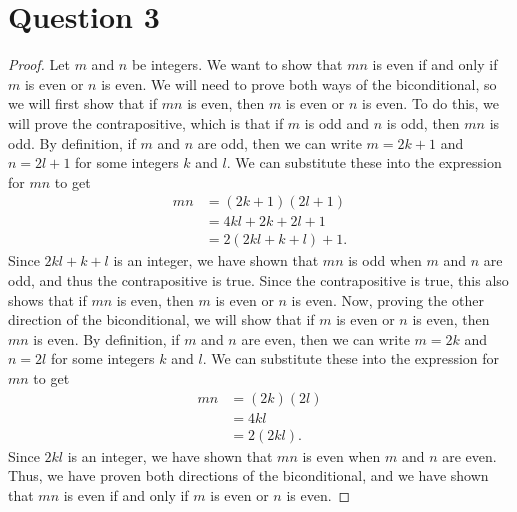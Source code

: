 \documentclass{article}
\begin{document}
\section*{Question 3}
\begin{proof}
    Let $m$ and $n$ be integers.
    We want to show that $mn$ is even if and only if $m$ is even or $n$ is even.
    We will need to prove both ways of the biconditional, so we will first show that 
    if $mn$ is even, then $m$ is even or $n$ is even.
    To do this, we will prove the contrapositive, which is that if $m$ is odd and $n$ is odd, then $mn$ is odd.
    By definition, if $m$ and $n$ are odd, then we can write $m = 2k + 1$ and $n = 2l + 1$ for some integers $k$ and $l$.
    We can substitute these into the expression for $mn$ to get
    \begin{align*}
        mn &= (2k + 1)(2l + 1) \\
        &= 4kl + 2k + 2l + 1 \\
        &= 2(2kl + k + l) + 1.
    \end{align*}
    Since $2kl + k + l$ is an integer, we have shown that $mn$ is odd when $m$ and $n$ are odd,
    and thus the contrapositive is true.
    Since the contrapositive is true, this also shows that if $mn$ is even, then $m$ is even or $n$ is even.
    Now, proving the other direction of the biconditional, we will show that if $m$ is even or $n$ is even, then $mn$ is even.
    By definition, if $m$ and $n$ are even, then we can write $m = 2k$ and $n = 2l$ for some integers $k$ and $l$.
    We can substitute these into the expression for $mn$ to get
    \begin{align*}
        mn &= (2k)(2l) \\
        &= 4kl \\
        &= 2(2kl).
    \end{align*}
    Since $2kl$ is an integer, we have shown that $mn$ is even when $m$ and $n$ are even.
    Thus, we have proven both directions of the biconditional, and we have shown that $mn$ is even if and only if $m$ is even or $n$ is even.
\end{proof}
\end{document}
